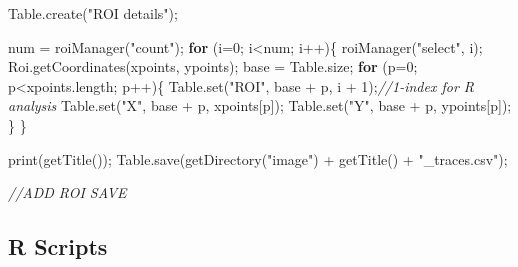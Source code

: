 \documentclass[
  12pt,
  a4paper,
]{book}
\newenvironment{Shaded}{}{}
\newcommand{\CommentTok}[1]{\textcolor[rgb]{0.38,0.63,0.69}{\textit{#1}}}
\newcommand{\ControlFlowTok}[1]{\textcolor[rgb]{0.00,0.44,0.13}{\textbf{#1}}}
\newcommand{\DecValTok}[1]{\textcolor[rgb]{0.25,0.63,0.44}{#1}}
\newcommand{\NormalTok}[1]{#1}
\newcommand{\OperatorTok}[1]{\textcolor[rgb]{0.40,0.40,0.40}{#1}}
\newcommand{\StringTok}[1]{\textcolor[rgb]{0.25,0.44,0.63}{#1}}
\begin{document}
\begin{Shaded}
\begin{Highlighting}[]
\NormalTok{Table}\OperatorTok{.}\NormalTok{create}\OperatorTok{(}\StringTok{"ROI details"}\OperatorTok{);}

\NormalTok{num }\OperatorTok{=}\NormalTok{ roiManager}\OperatorTok{(}\StringTok{"count"}\OperatorTok{);}
\ControlFlowTok{for} \OperatorTok{(}\NormalTok{i}\OperatorTok{=}\DecValTok{0}\OperatorTok{;}\NormalTok{ i}\OperatorTok{\textless{}}\NormalTok{num}\OperatorTok{;}\NormalTok{ i}\OperatorTok{++)\{}
\NormalTok{    roiManager}\OperatorTok{(}\StringTok{"select"}\OperatorTok{,}\NormalTok{ i}\OperatorTok{);}
\NormalTok{    Roi}\OperatorTok{.}\NormalTok{getCoordinates}\OperatorTok{(}\NormalTok{xpoints}\OperatorTok{,}\NormalTok{ ypoints}\OperatorTok{);}
\NormalTok{    base }\OperatorTok{=}\NormalTok{ Table}\OperatorTok{.}\NormalTok{size}\OperatorTok{;}
    \ControlFlowTok{for} \OperatorTok{(}\NormalTok{p}\OperatorTok{=}\DecValTok{0}\OperatorTok{;}\NormalTok{ p}\OperatorTok{\textless{}}\NormalTok{xpoints}\OperatorTok{.}\NormalTok{length}\OperatorTok{;}\NormalTok{ p}\OperatorTok{++)\{}
\NormalTok{        Table}\OperatorTok{.}\NormalTok{set}\OperatorTok{(}\StringTok{"ROI"}\OperatorTok{,}\NormalTok{ base }\OperatorTok{+}\NormalTok{ p}\OperatorTok{,}\NormalTok{ i }\OperatorTok{+} \DecValTok{1}\OperatorTok{);}\CommentTok{//1{-}index for R analysis}
\NormalTok{        Table}\OperatorTok{.}\NormalTok{set}\OperatorTok{(}\StringTok{"X"}\OperatorTok{,}\NormalTok{ base }\OperatorTok{+}\NormalTok{ p}\OperatorTok{,}\NormalTok{ xpoints}\OperatorTok{[}\NormalTok{p}\OperatorTok{]);}
\NormalTok{        Table}\OperatorTok{.}\NormalTok{set}\OperatorTok{(}\StringTok{"Y"}\OperatorTok{,}\NormalTok{ base }\OperatorTok{+}\NormalTok{ p}\OperatorTok{,}\NormalTok{ ypoints}\OperatorTok{[}\NormalTok{p}\OperatorTok{]);}
    \OperatorTok{\}}
\OperatorTok{\}}

\NormalTok{print}\OperatorTok{(}\NormalTok{getTitle}\OperatorTok{());}
\NormalTok{Table}\OperatorTok{.}\NormalTok{save}\OperatorTok{(}\NormalTok{getDirectory}\OperatorTok{(}\StringTok{"image"}\OperatorTok{)} \OperatorTok{+}\NormalTok{ getTitle}\OperatorTok{()} \OperatorTok{+} \StringTok{"\_traces.csv"}\OperatorTok{);}

\CommentTok{//ADD ROI SAVE}
\end{Highlighting}
\end{Shaded}

\hypertarget{r-scripts}{%
\subsection{R Scripts}\label{r-scripts}}
\end{document}
